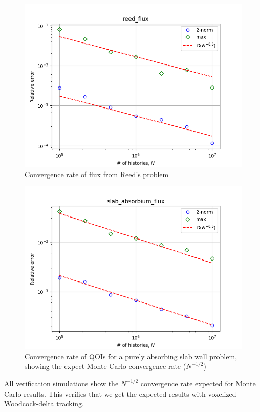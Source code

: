 \begin{figure}
  \centering
  \includegraphics[scale=0.75]{figures/delta_figs/verification/reed/reed_flux.png}
  \caption{Convergence rate of flux from Reed's problem \cite{reed_difference_1971}}
  \label{fig:reeds}
\end{figure}
\begin{figure}
    \centering
    \includegraphics[width=0.75\linewidth]{figures/delta_figs/verification/abs_slab/slab_absorbium_flux.png}
    \caption{Convergence rate of QOIs for a purely absorbing slab wall problem, showing the expect Monte Carlo convergence rate ($N^{-1/2}$)}
    \label{fig:abs_slab}
\end{figure}

All verification simulations show the $N^{-1/2}$ convergence rate expected for Monte Carlo results.
This verifies that we get the expected results with voxelized Woodcock-delta tracking.


